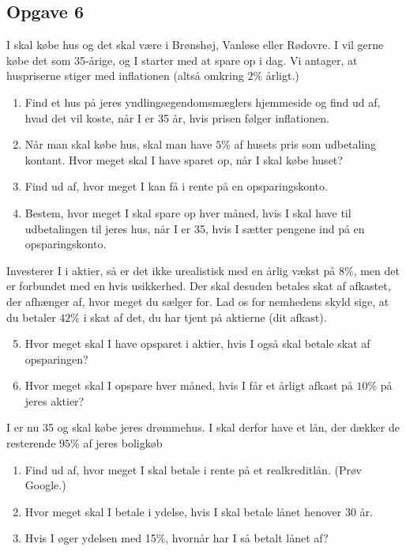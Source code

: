 \subsection*{Opgave 6}
I skal købe hus og det skal være i Brønshøj, Vanløse eller Rødovre. I vil gerne købe det som 35-årige, og I starter med at spare op i dag. Vi antager, at huspriserne stiger med inflationen (altså omkring $2\%$ årligt.)
\begin{enumerate}[label=\roman*)]
	\item Find et hus på jeres yndlingsegendomsmæglers hjemmeside og find ud af, hvad det vil koste,
	 når I er 35 år, hvis prisen følger inflationen. 
	\item Når man skal købe hus, skal man have $5\%$ af husets pris som udbetaling kontant. Hvor meget skal 
	I have sparet op, når I skal købe huset?
	\item Find ud af, hvor meget I kan få i rente på en opsparingskonto.
	\item Bestem, hvor meget I skal spare op hver måned, hvis I skal have til udbetalingen til jeres hus, når I 
	er 35, hvis I sætter pengene ind på en opsparingskonto. 
\end{enumerate}
Investerer I i aktier, så er det ikke urealistisk med en årlig vækst på $8\%$, men det er forbundet med en hvis usikkerhed. Der skal desuden betales skat af afkastet, der afhænger af, hvor meget du sælger for. Lad os for nemhedens skyld sige, at du betaler $42\%$ i skat af det, du har tjent på aktierne (dit afkast). 
\begin{enumerate}[label=\roman*)]
	\setcounter{enumi}{4}
	\item Hvor meget skal I have opsparet i aktier, hvis I også skal betale skat af opsparingen?
	\item Hvor meget skal I opspare hver måned, hvis I får et årligt afkast på $10\%$ på jeres aktier?
\end{enumerate}
I er nu 35 og skal købe jeres drømmehus. I skal derfor have et lån, der dækker de resterende $95\%$ af jeres boligkøb
\begin{enumerate}[label=\roman*)]
	\item Find ud af, hvor meget I skal betale i rente på et realkreditlån. (Prøv Google.)
	\item Hvor meget skal I betale i ydelse, hvis I skal betale lånet henover 30 år. 
	\item Hvis I øger ydelsen med 15$\%$, hvornår har I så betalt lånet af?
\end{enumerate}
